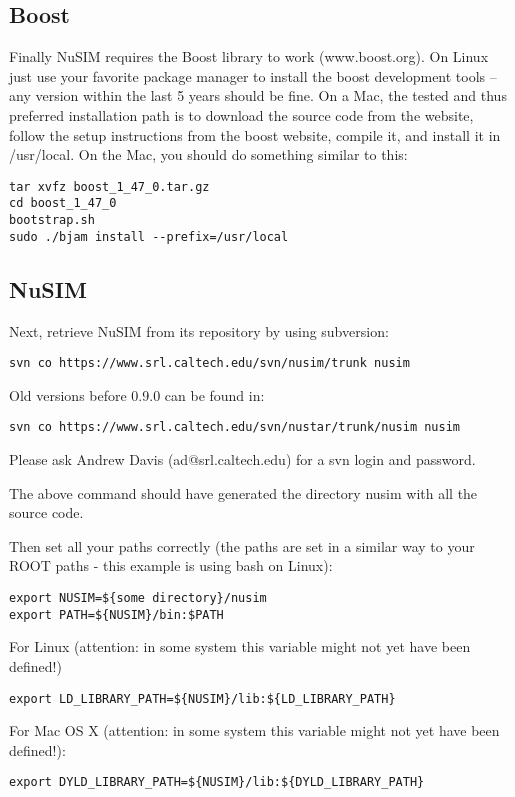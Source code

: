 \subsection{Boost}
Finally NuSIM requires the Boost library to work (www.boost.org). On Linux just use your favorite package manager to install the boost development tools -- any version within the last 5 years should be fine. On a Mac, the tested and thus preferred installation path is to download the source code from the website, follow the setup instructions from the boost website, compile it, and install it in /usr/local. On the Mac, you should do something similar to this:
\begin{verbatim}
tar xvfz boost_1_47_0.tar.gz
cd boost_1_47_0
bootstrap.sh
sudo ./bjam install --prefix=/usr/local 
\end{verbatim}

\subsection{NuSIM}
Next, retrieve NuSIM from its repository by using subversion:
\begin{verbatim}
svn co https://www.srl.caltech.edu/svn/nusim/trunk nusim
\end{verbatim}
Old versions before 0.9.0 can be found in:
\begin{verbatim}
svn co https://www.srl.caltech.edu/svn/nustar/trunk/nusim nusim
\end{verbatim}
Please ask Andrew Davis (ad@srl.caltech.edu) for a svn login and password.

The above command should have generated the directory nusim with all the source code.

Then set all your paths correctly (the paths are set in a similar way to your ROOT paths - this example is using bash on Linux):
\begin{verbatim}
export NUSIM=${some directory}/nusim
export PATH=${NUSIM}/bin:$PATH
\end{verbatim}
For Linux (attention: in some system this variable might not yet have been defined!)
\begin{verbatim}
export LD_LIBRARY_PATH=${NUSIM}/lib:${LD_LIBRARY_PATH}
\end{verbatim}
For Mac OS X (attention: in some system this variable might not yet have been defined!):
\begin{verbatim}
export DYLD_LIBRARY_PATH=${NUSIM}/lib:${DYLD_LIBRARY_PATH}
\end{verbatim}

